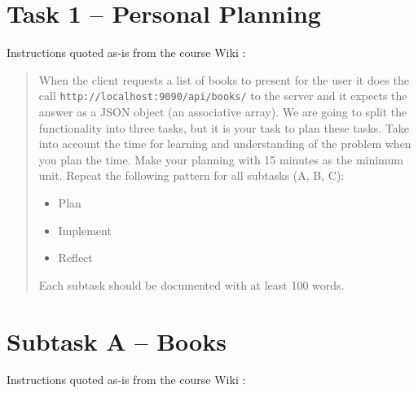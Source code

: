 %
%
%
%


\section{Task 1 -- Personal Planning}
Instructions quoted as-is from the course Wiki \cite{1dv600:lab1:instructions}:

\begin{quote}
  When the client requests a list of books to present for the user it does the
  call \texttt{http://localhost:9090/api/books/} to the server and it expects
  the answer as a JSON object (an associative array). We are going to split the
  functionality into three tasks, but it is your task to plan these tasks. Take
  into account the time for learning and understanding of the problem when you
  plan the time. Make your planning with 15 minutes as the minimum unit. Repeat
  the following pattern for all subtasks (A, B, C):
  
  \begin{itemize}
    \item Plan
    \item Implement
    \item Reflect
  \end{itemize}
  
  Each subtask should be documented with at least 100 words.
\end{quote}


\section{Subtask A -- Books}\label{task-1a}
Instructions quoted as-is from the course Wiki \cite{1dv600:lab1:instructions}:

